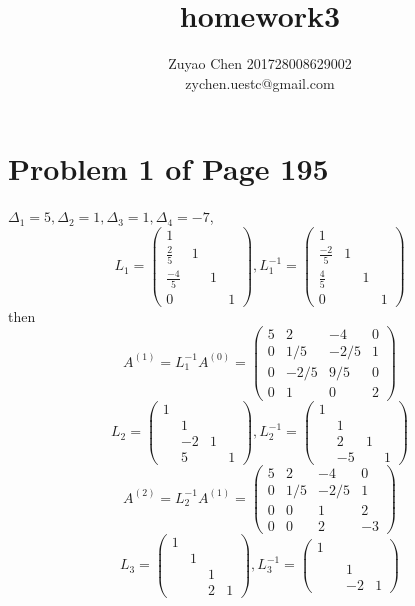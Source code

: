 \documentclass[12pt,a4paper]{article}
\title{homework3}
\author{Zuyao Chen 201728008629002 \\ zychen.uestc@gmail.com}
\date{}
\newcommand{\mysection}[2]{
\section{Problem #1 of Page #2}	
	}
\begin{document}
\maketitle
\mysection{1}{195}
$\Delta_1 = 5, \Delta_2 =1, \Delta_3 = 1,\Delta_4 = -7$, 
\[
	L_1 = \left( \begin{array}{cccc}
		1 & & & \\
		\frac{2}{5} & 1 & &  \\
		\frac{-4}{5} & &1 &  \\
		0 & & & 1
	\end{array} \right),
	L_1^{-1} = \left( \begin{array}{cccc}
	1 & & & \\
	\frac{-2}{5} & 1 & &  \\
	\frac{4}{5} & &1 &  \\
	0 & & & 1
	\end{array} \right)
\]
then
\[	
	A^{(1)} = L_1^{-1}A^{(0)} = \left( \begin{array}{cccc}
	5 & 2 & -4 & 0\\
	0 & 1/5 & -2/5 & 1 \\
	0 & -2/5 & 9/5 & 0 \\
	0 & 1 & 0 & 2 
	\end{array} \right)
\]
\[
	L_2 = \left( \begin{array}{cccc}
	1 & & & \\
	 & 1 & &  \\
	 & -2&1 &  \\
	 & 5& & 1
	\end{array} \right),
	L_2^{-1} = \left( \begin{array}{cccc}
	1 & & & \\
	& 1 & &  \\
	& 2&1 &  \\
	& -5& & 1
	\end{array} \right)	
\]
\[
	A^{(2)} = L_2^{-1}A^{(1)} = \left( \begin{array}{cccc}
	5 & 2 & -4 & 0\\
	0 & 1/5 & -2/5 & 1 \\
	0 & 0 & 1 & 2 \\
	0 & 0 & 2 & -3 
	\end{array} \right)
\]
\[
	L_3 = \left( \begin{array}{cccc}
	1 & & & \\
	& 1 & &  \\
	& &1 &  \\
	& &2& 1
	\end{array} \right),
	L_3^{-1} = \left( \begin{array}{cccc}
	1 & & & \\
	&  & &  \\
	& &1 &  \\
	& &-2 & 1
	\end{array} \right)	
\]
\end{document}
